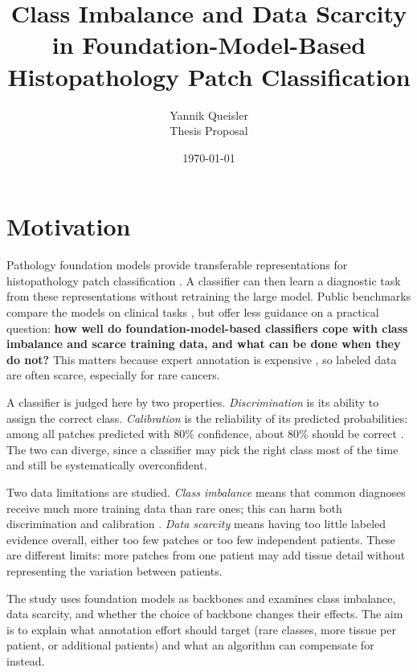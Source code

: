 \documentclass[11pt,a4paper]{article}
\title{Class Imbalance and Data Scarcity in Foundation-Model-Based\\Histopathology Patch Classification}
\author{Yannik Queisler\\[2pt]\small Thesis Proposal}
\date{\today}
\begin{document}
\maketitle

\section{Motivation}
Pathology foundation models provide transferable representations for histopathology patch classification \citep{chen2024uni,vorontsov2024virchow}.
A classifier can then learn a diagnostic task from these representations without retraining the large model.
Public benchmarks compare the models on clinical tasks \citep{campanella2025benchmark}, but offer less guidance on a practical question: \textbf{how well do foundation-model-based classifiers cope with class imbalance and scarce training data, and what can be done when they do not?}
This matters because expert annotation is expensive \citep{lu2021dataEfficient}, so labeled data are often scarce, especially for rare cancers.

A classifier is judged here by two properties.
\emph{Discrimination} is its ability to assign the correct class.
\emph{Calibration} is the reliability of its predicted probabilities: among all patches predicted with 80\% confidence, about 80\% should be correct \citep{guo2017calibration}.
The two can diverge, since a classifier may pick the right class most of the time and still be systematically overconfident.

Two data limitations are studied.
\emph{Class imbalance} means that common diagnoses receive much more training data than rare ones; this can harm both discrimination and calibration \citep{mosquera2024classImbalance}.
\emph{Data scarcity} means having too little labeled evidence overall, either too few patches or too few independent patients.
These are different limits: more patches from one patient may add tissue detail without representing the variation between patients.

The study uses foundation models as backbones and examines class imbalance, data scarcity, and whether the choice of backbone changes their effects.
The aim is to explain what annotation effort should target (rare classes, more tissue per patient, or additional patients) and what an algorithm can compensate for instead.
\end{document}
